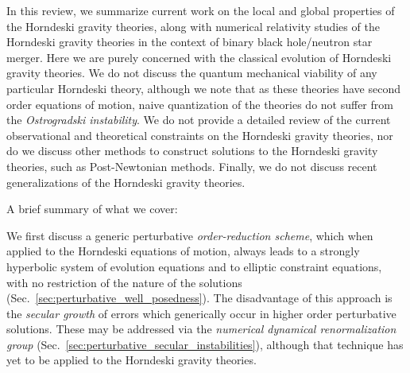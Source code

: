 \documentclass{ws-ijmpd}
\begin{document}
In this review, we summarize current work on the local and global
properties of the Horndeski gravity theories, along with numerical
relativity studies of the Horndeski gravity theories in the
context of binary black hole/neutron star merger.
Here we are purely concerned with the classical evolution
of Horndeski gravity theories.
We do not discuss
the quantum mechanical viability of any particular Horndeski theory,
although we note that as these theories have second order equations
of motion, naive quantization of the theories
do not suffer from the 
\emph{Ostrogradski instability}\cite{Woodard:2015zca,Kobayashi:2019hrl}.
We do not provide a detailed review of
the current observational and
theoretical constraints on the Horndeski gravity theories, nor
do we discuss other methods to construct solutions to the
Horndeski gravity theories, such as Post-Newtonian methods.
Finally, we do not discuss recent generalizations of the Horndeski
gravity theories\cite{Kobayashi:2019hrl}.

A brief summary of what we cover:

We first discuss a generic perturbative
\emph{order-reduction scheme}, which when applied to the Horndeski
equations of motion, always leads to a strongly hyperbolic system of
evolution equations and to elliptic constraint equations, with
no restriction of the nature of the solutions 
(Sec.~\ref{sec:perturbative_well_posedness}).
The disadvantage of this approach is the \emph{secular growth}
of errors which generically occur in higher order perturbative solutions.
These may be addressed via the 
\emph{numerical dynamical renormalization group}
(Sec.~\ref{sec:perturbative_secular_instabilities}), although
that technique has yet to be applied to the Horndeski gravity theories.
\end{document}
